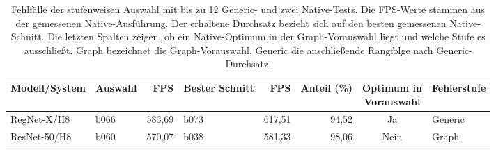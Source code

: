 \begin{table}[t]
\centering\small
\caption{Fehlfälle der stufenweisen Auswahl mit bis zu 12 Generic- und zwei Native-Tests. Die FPS-Werte stammen aus der gemessenen Native-Ausführung. Der erhaltene Durchsatz bezieht sich auf den besten gemessenen Native-Schnitt. Die letzten Spalten zeigen, ob ein Native-Optimum in der Graph-Vorauswahl liegt und welche Stufe es ausschließt. Graph bezeichnet die Graph-Vorauswahl, Generic die anschließende Rangfolge nach Generic-Durchsatz.}
\label{tab:staged-failures-12}
\setlength{\tabcolsep}{3pt}
\begin{tabular*}{\textwidth}{@{\extracolsep{\fill}}llrlrrcl@{}}
\toprule
Modell/System & Auswahl & FPS & Bester Schnitt & FPS & Anteil (\%) & \shortstack{Optimum in\\Vorauswahl} & Fehlerstufe \\
\midrule
RegNet-X/H8 & b066 & 583,69 & b073 & 617,51 & 94,52 & Ja & Generic\\
ResNet-50/H8 & b060 & 570,07 & b038 & 581,33 & 98,06 & Nein & Graph\\
\bottomrule
\end{tabular*}
\end{table}
